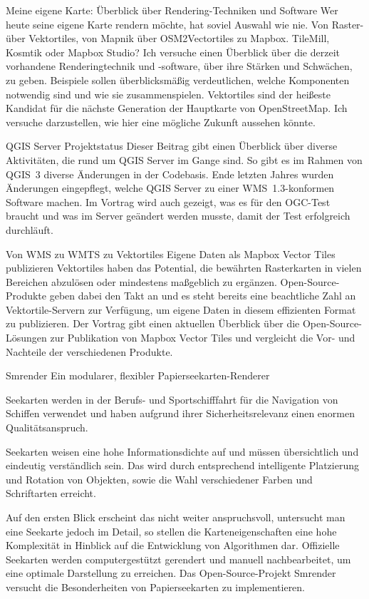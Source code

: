 %
{Meine eigene Karte: Überblick über Rendering-Techniken und Software}%
{}%
{Wer heute seine eigene Karte rendern möchte, hat soviel Auswahl wie nie. Von Raster- über
Vektortiles, von Mapnik über OSM2Vectortiles zu Mapbox. TileMill, Kosmtik oder Mapbox Studio? Ich
versuche einen Überblick über die derzeit vorhandene Renderingtechnik und -software, über ihre
Stärken und Schwächen, zu geben. Beispiele sollen überblicksmäßig verdeutlichen, welche Komponenten
notwendig sind und wie sie zusammenspielen. Vektortiles sind der heißeste Kandidat für die nächste
Generation der Hauptkarte von OpenStreetMap. Ich versuche darzustellen, wie hier eine mögliche
Zukunft aussehen könnte.}


%
{QGIS Server Projektstatus}%
{}%
{Dieser Beitrag gibt einen Überblick über diverse Aktivitäten, die rund um QGIS
Server im Gange sind. So gibt es im Rahmen von QGIS~3 diverse Änderungen in der
Codebasis. Ende letzten Jahres wurden Änderungen eingepflegt, welche QGIS
Server zu einer WMS~1.3-konformen Software machen. Im Vortrag wird auch
gezeigt, was es für den OGC-Test braucht und was im Server geändert werden
musste, damit der Test erfolgreich durchläuft.}

%
{Von WMS zu WMTS zu Vektortiles}%
{Eigene Daten als Mapbox Vector Tiles publizieren}%
{Vektortiles haben das Potential, die bewährten
Rasterkarten in vielen Bereichen abzulösen oder mindestens maßgeblich zu ergänzen.
Open-Source-Produkte geben dabei den Takt an und es steht bereits eine beachtliche Zahl an
Vektortile-Servern zur Verfügung, um eigene Daten in diesem effizienten Format zu publizieren. Der
Vortrag gibt einen aktuellen Überblick über die Open-Source-Lösungen zur Publikation von Mapbox
Vector Tiles und vergleicht die Vor- und Nachteile der verschiedenen Produkte. }

%
{Smrender}%
{Ein modularer, flexibler Papierseekarten-Renderer}%
{Seekarten werden in der Berufs- und Sportschifffahrt für die Navigation von
Schiffen verwendet und haben aufgrund ihrer Sicherheitsrelevanz einen enormen
Qualitätsanspruch.

Seekarten weisen eine hohe Informationsdichte auf und müssen übersichtlich und
eindeutig verständlich sein. Das wird durch entsprechend intelligente
Platzierung und Rotation von Objekten, sowie die Wahl verschiedener Farben und
Schriftarten erreicht.

Auf den ersten Blick erscheint das nicht weiter anspruchsvoll, untersucht man
eine Seekarte jedoch im Detail, so stellen die Karteneigenschaften eine hohe
Komplexität in Hinblick auf die Entwicklung von Algorithmen dar.
Offizielle Seekarten werden computergestützt gerendert und manuell
nachbearbeitet, um eine optimale Darstellung zu erreichen.
Das Open-Source-Projekt Smrender versucht die Besonderheiten von Papierseekarten
zu implementieren.}

